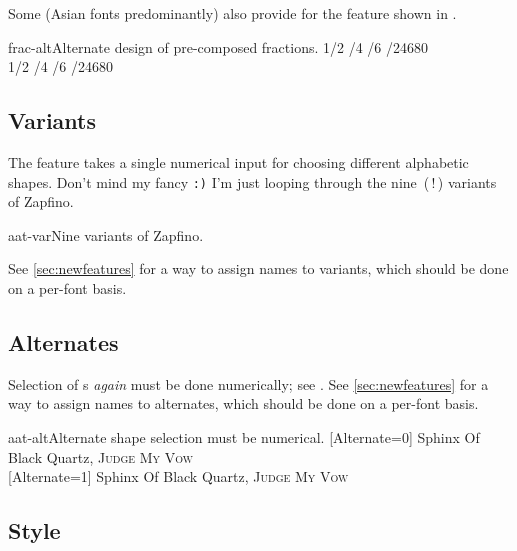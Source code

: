 \documentclass[a4paper]{l3doc}
\begin{document}
Some (Asian fonts predominantly) also provide for the
 feature shown in .

\begin{Xexample}{frac-alt}{Alternate design of pre-composed fractions.}
   1/2 /4 /6 /24680 \\
   1/2 /4 /6 /24680
\end{Xexample}


\subsection{Variants}
The  feature takes a single numerical input for
choosing different alphabetic shapes. Don't mind my fancy 
\texttt{:)} I'm just looping through the nine~(\,!\,) variants of
Zapfino.

\begin{Xexample}[firstline=2,lastline=9]{aat-var}{Nine variants of Zapfino.}
  \Huge \rule{0pt}{2cm}
  \hspace*{2cm}
\end{Xexample}

See \vref{sec:newfeatures} for a way to assign names to variants,
which should be done on a per-font basis.

\subsection{Alternates}

Selection of s \emph{again}
must be done numerically; see .
See \vref{sec:newfeatures} for a way to assign names to alternates,
which should be done on a per-font basis.

\begin{Xexample}{aat-alt}{Alternate shape selection must be numerical.}
  [Alternate=0]
   Sphinx Of Black Quartz, {\scshape Judge My Vow} \\
  [Alternate=1]
   Sphinx Of Black Quartz, {\scshape Judge My Vow}
\end{Xexample}


\subsection{Style}
\end{document}
